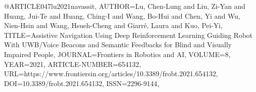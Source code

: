 @ARTICLE{047lu2021navassit,
AUTHOR={Lu, Chen-Lung and Liu, Zi-Yan and Huang, Jui-Te and Huang, Ching-I and Wang, Bo-Hui and Chen, Yi and Wu, Nien-Hsin and Wang, Hsueh-Cheng and Giarré, Laura and Kuo, Pei-Yi},   
TITLE={Assistive Navigation Using Deep Reinforcement Learning Guiding Robot With UWB/Voice Beacons and Semantic Feedbacks for Blind and Visually Impaired People},
JOURNAL={Frontiers in Robotics and AI},      
VOLUME={8},           
YEAR={2021},
ARTICLE-NUMBER={654132},
URL={https://www.frontiersin.org/articles/10.3389/frobt.2021.654132},       
DOI={10.3389/frobt.2021.654132},      
ISSN={2296-9144},   
}